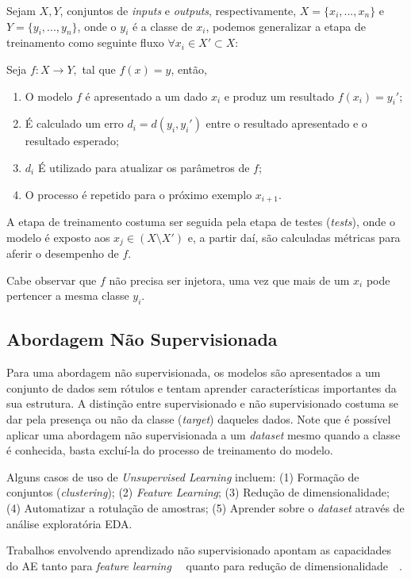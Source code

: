 Sejam $X, Y$, conjuntos de \textit{inputs} e \textit{outputs}, respectivamente, $X=\{x_i, ..., x_n\}$ e $Y=\{y_i, ..., y_n\}$, onde o $y_i$ é a classe de $x_i$, podemos generalizar a etapa de treinamento como seguinte fluxo $\forall x_i \in X' \subset X$:

Seja $f: X \rightarrow Y,$ tal que $f(x) = y$, então,

\begin{enumerate}
    \item O modelo $f$ é apresentado a um dado $x_i$ e produz um resultado $f(x_i) = y_i'$;
    \item É calculado um erro $d_i = d(y_i, y_i')$ entre o resultado apresentado e o resultado esperado;
    \item $d_i$ É utilizado para atualizar os parâmetros de $f$;
    \item O processo é repetido para o próximo exemplo $x_{i+1}$.
\end{enumerate}

A etapa de treinamento costuma ser seguida pela etapa de testes (\textit{tests}), onde o modelo é exposto aos $x_j \in (X \setminus X')$ e, a partir daí, são calculadas métricas para aferir o desempenho de $f$.

Cabe observar que $f$ não precisa ser injetora, uma vez que mais de um $x_i$ pode pertencer a mesma classe $y_i$.

\subsection{Abordagem Não Supervisionada}

Para uma abordagem não supervisionada, os modelos são apresentados a um conjunto de dados sem rótulos e tentam aprender características importantes da sua estrutura. A distinção entre supervisionado e não supervisionado costuma se dar pela presença ou não da classe (\textit{target}) daqueles dados. Note que é possível aplicar uma abordagem não supervisionada a um \textit{dataset} mesmo quando a classe é conhecida, basta excluí-la do processo de treinamento do modelo.

Alguns casos de uso de \textit{Unsupervised Learning} incluem: (1) Formação de conjuntos (\textit{clustering}); (2) \textit{Feature Learning}; (3) Redução de dimensionalidade; (4) Automatizar a rotulação de amostras; (5) Aprender sobre o \textit{dataset} através de análise exploratória \acrlong{EDA}.

Trabalhos envolvendo aprendizado não supervisionado apontam as capacidades do \acrshort{AE} tanto para \textit{feature learning}~\cite{35.16}~\cite{35.17} quanto para redução de dimensionalidade~\cite{35.18}~\cite{35.19}.


